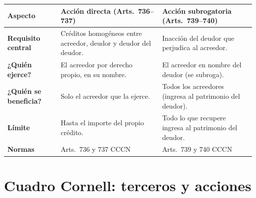 \documentclass[12pt,oneside]{book}
\begin{document}
\begin{center}
\renewcommand{\arraystretch}{1.3}
\begin{tabularx}{\textwidth}{
    >{\raggedright\arraybackslash\bfseries}p{2.6cm}
    >{\raggedright\arraybackslash}X
    >{\raggedright\arraybackslash}X
}
\toprule
\textbf{Aspecto} & \textbf{Acción directa (Arts.~736--737)} & \textbf{Acción subrogatoria (Arts.~739--740)} \\
\midrule
Requisito central & Créditos homogéneos entre acreedor, deudor y deudor del deudor. & Inacción del deudor que perjudica al acreedor. \\
\addlinespace
¿Quién ejerce? & El acreedor por derecho propio, en su nombre. & El acreedor en nombre del deudor (se subroga). \\
\addlinespace
¿Quién se beneficia? & Solo el acreedor que la ejerce. & Todos los acreedores (ingresa al patrimonio del deudor). \\
\addlinespace
Límite & Hasta el importe del propio crédito. & Todo lo que recupere ingresa al patrimonio del deudor. \\
\addlinespace
Normas & Arts.~736 y 737 CCCN & Arts.~739 y 740 CCCN \\
\bottomrule
\end{tabularx}
\end{center}

\section{Cuadro Cornell: terceros y acciones}
\end{document}

